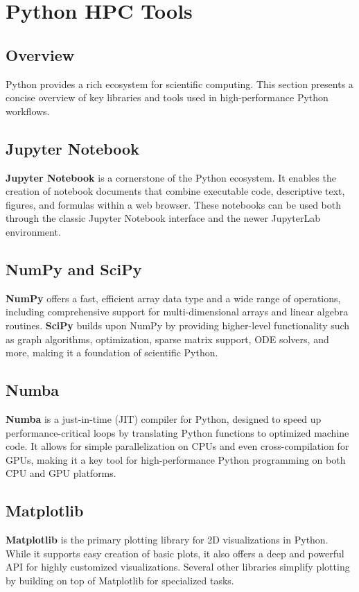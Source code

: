 \documentclass{book}
\begin{document}
\chapter{Python HPC Tools}

\section*{Overview}
Python provides a rich ecosystem for scientific computing. This section presents a concise overview of key libraries and tools used in high-performance Python workflows.

\section{Jupyter Notebook}
\textbf{Jupyter Notebook} is a cornerstone of the Python ecosystem. It enables the creation of notebook documents that combine executable code, descriptive text, figures, and formulas within a web browser. These notebooks can be used both through the classic Jupyter Notebook interface and the newer JupyterLab environment.

\section{NumPy and SciPy}
\textbf{NumPy} offers a fast, efficient array data type and a wide range of operations, including comprehensive support for multi-dimensional arrays and linear algebra routines.  
\textbf{SciPy} builds upon NumPy by providing higher-level functionality such as graph algorithms, optimization, sparse matrix support, ODE solvers, and more, making it a foundation of scientific Python.

\section{Numba}
\textbf{Numba} is a just-in-time (JIT) compiler for Python, designed to speed up performance-critical loops by translating Python functions to optimized machine code. It allows for simple parallelization on CPUs and even cross-compilation for GPUs, making it a key tool for high-performance Python programming on both CPU and GPU platforms.

\section{Matplotlib}
\textbf{Matplotlib} is the primary plotting library for 2D visualizations in Python. While it supports easy creation of basic plots, it also offers a deep and powerful API for highly customized visualizations. Several other libraries simplify plotting by building on top of Matplotlib for specialized tasks.
\end{document}
